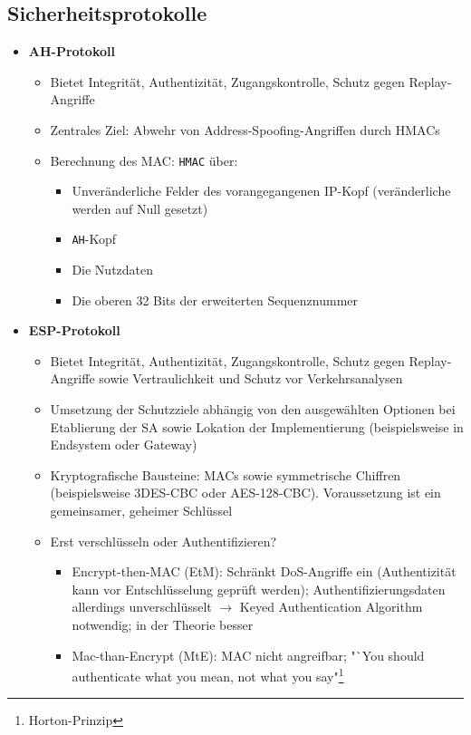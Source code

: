 \subsection{Sicherheitsprotokolle}
\begin{itemize}
	\item \textbf{AH-Protokoll}
	\begin{itemize}
		\item Bietet Integrität, Authentizität, Zugangskontrolle, Schutz gegen Replay-Angriffe
		\item Zentrales Ziel: Abwehr von Address-Spoofing-Angriffen durch HMACs
		\item Berechnung des MAC: \texttt{HMAC} über:
		\begin{itemize}
			\item Unveränderliche Felder des vorangegangenen IP-Kopf (veränderliche werden auf Null gesetzt)
			\item \texttt{AH}-Kopf
			\item Die Nutzdaten
			\item Die oberen 32 Bits der erweiterten Sequenznummer
		\end{itemize}
	\end{itemize}
	\item \textbf{ESP-Protokoll}
	\begin{itemize}
		\item Bietet Integrität, Authentizität, Zugangskontrolle, Schutz gegen Replay-Angriffe sowie Vertraulichkeit und Schutz vor Verkehrsanalysen
		\item Umsetzung der Schutzziele abhängig von den ausgewählten Optionen bei Etablierung der SA sowie Lokation der Implementierung (beispielsweise in Endsystem oder Gateway)
		\item Kryptografische Bausteine: MACs sowie symmetrische Chiffren (beispielsweise 
		3DES-CBC oder AES-128-CBC). Voraussetzung ist ein gemeinsamer, geheimer Schlüssel
		\item Erst verschlüsseln oder Authentifizieren?
		\begin{itemize}
			\item Encrypt-then-MAC (EtM): Schränkt DoS-Angriffe ein (Authentizität kann vor Entschlüsselung geprüft werden); Authentifizierungsdaten allerdings unverschlüsselt \(\rightarrow\) Keyed Authentication Algorithm notwendig; in der Theorie besser
			\item Mac-than-Encrypt (MtE): MAC nicht angreifbar; "`You should authenticate what you mean, not what you say"\footnote{Horton-Prinzip}
		\end{itemize}

\end{itemize}
\end{itemize}

